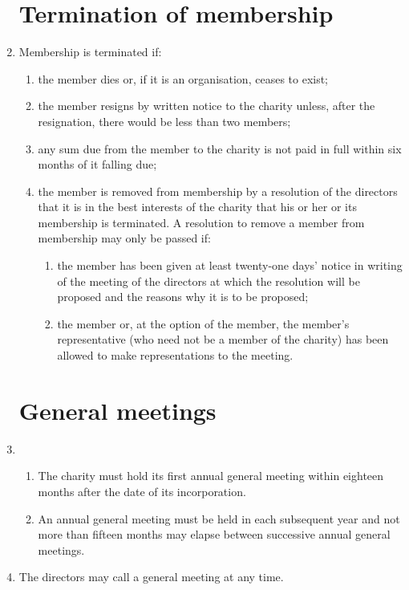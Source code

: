 \documentclass{article}
\begin{document}
\begin{enumerate}[label=\arabic*]
    \section{Termination of membership}
    \item Membership is terminated if:
    \begin{enumerate}[label=(\arabic*)]
        \item the member dies or, if it is an organisation, ceases to exist;
        \item the member resigns by written notice to the charity unless, after
        the resignation, there would be less than two members;
        \item any sum due from the member to the charity is not paid in full
        within six months of it falling due;
        \item the member is removed from membership by a resolution of
        the directors that it is in the best interests of the charity that his
        or her or its membership is terminated. A resolution to remove a
        member from membership may only be passed if:
        \begin{enumerate}[label=(\alph*)]
            \item the member has been given at least twenty-one days’
            notice in writing of the meeting of the directors at which
            the resolution will be proposed and the reasons why it is
            to be proposed;
            \item the member or, at the option of the member, the
            member’s representative (who need not be a member of
            the charity) has been allowed to make representations to
            the meeting.
        \end{enumerate}
    \end{enumerate}
    
    \section{General meetings}
    \item \begin{enumerate}[label=(\arabic*)]
        \item The charity must hold its first annual general meeting within
        eighteen months after the date of its incorporation.
        \item An annual general meeting must be held in each subsequent
        year and not more than fifteen months may elapse between
        successive annual general meetings.
    \end{enumerate}
    \item The directors may call a general meeting at any time.
    

\end{enumerate}
\end{document}
